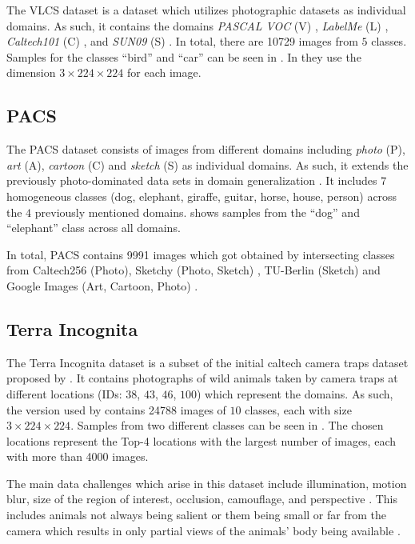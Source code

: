The VLCS dataset \citep{FangXR13} is a dataset which utilizes photographic datasets as individual domains. As such, it contains the domains \emph{PASCAL VOC} (V) \citep{EveringhamGWWZ10}, \emph{LabelMe} (L) \citep{RussellTMF08}, \emph{Caltech101} (C) \citep{Fei-FeiFP07}, and \emph{SUN09} (S) \citep{ChoiLTW10}. In total, there are \num{10729} images from $5$ classes. Samples for the classes ``bird'' and ``car'' can be seen in . In \citet{gulrajani2020search} they use the dimension $3 \times 224 \times 224$ for each image. 

\subsection{PACS}
The PACS dataset \citep{LiYSH17} consists of images from different domains including \emph{photo} (P), \emph{art} (A), \emph{cartoon} (C) and \emph{sketch} (S) as individual domains. As such, it extends the previously photo-dominated data sets in domain generalization \citep{LiYSH17}. It includes $7$ homogeneous classes (dog, elephant, giraffe, guitar, horse, house, person) across the $4$ previously mentioned domains.  shows samples from the ``dog'' and ``elephant'' class across all domains. 

In total, PACS contains \num{9991} images which got obtained by intersecting classes from Caltech256 (Photo), Sketchy (Photo, Sketch) \citep{SangkloyBHH16}, TU-Berlin (Sketch) \citep{EitzHA12} and Google Images (Art, Cartoon, Photo) \citep{LiYSH17}.


\subsection{Terra Incognita}
The Terra Incognita dataset is a subset of the initial caltech camera traps dataset proposed by \citet{BeeryHP18}. It contains photographs of wild animals taken by camera traps at different locations (IDs: $38$, $43$, $46$, $100$) which represent the domains. As such, the version used by \citet{gulrajani2020search} contains \num{24788} images of $10$ classes, each with size $3\times 224 \times 224$. Samples from two different classes can be seen in . The chosen locations represent the Top-4 locations with the largest number of images, each with more than \num{4000} images. 

The main data challenges which arise in this dataset include illumination, motion blur, size of the region of interest, occlusion, camouflage, and perspective \citep{BeeryHP18}. This includes animals not always being salient or them being small or far from the camera which results in only partial views of the animals' body being available \citep{BeeryHP18}. 

